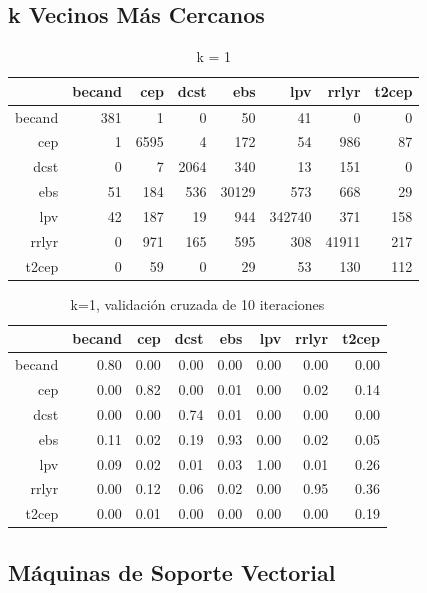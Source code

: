 \documentclass[letterpaper,12pt]{book}
\begin{document}
\subsection{k Vecinos Más Cercanos}
\begin{table}[ht]
  \centering
  \caption{k = 1} 
  \label{table:cmknn}
  \begin{tabular}{rrrrrrrr}
    \hline
    & becand & cep & dcst & ebs & lpv & rrlyr & t2cep \\ 
    \hline
    becand & 381 &   1 &   0 &  50 &  41 &   0 &   0 \\ 
    cep &   1 & 6595 &   4 & 172 &  54 & 986 &  87 \\ 
    dcst &   0 &   7 & 2064 & 340 &  13 & 151 &   0 \\ 
    ebs &  51 & 184 & 536 & 30129 & 573 & 668 &  29 \\ 
    lpv &  42 & 187 &  19 & 944 & 342740 & 371 & 158 \\ 
    rrlyr &   0 & 971 & 165 & 595 & 308 & 41911 & 217 \\ 
    t2cep &   0 &  59 &   0 &  29 &  53 & 130 & 112 \\ 
    \hline
  \end{tabular}
\end{table}

\begin{table}[ht]
  \centering
  \caption{k=1, validación cruzada de 10 iteraciones} 
  \label{table:cmCvKnn}
  \begin{tabular}{rrrrrrrr}
    \hline
    & becand & cep & dcst & ebs & lpv & rrlyr & t2cep \\ 
    \hline
    becand & 0.80 & 0.00 & 0.00 & 0.00 & 0.00 & 0.00 & 0.00 \\ 
    cep & 0.00 & 0.82 & 0.00 & 0.01 & 0.00 & 0.02 & 0.14 \\ 
    dcst & 0.00 & 0.00 & 0.74 & 0.01 & 0.00 & 0.00 & 0.00 \\ 
    ebs & 0.11 & 0.02 & 0.19 & 0.93 & 0.00 & 0.02 & 0.05 \\ 
    lpv & 0.09 & 0.02 & 0.01 & 0.03 & 1.00 & 0.01 & 0.26 \\ 
    rrlyr & 0.00 & 0.12 & 0.06 & 0.02 & 0.00 & 0.95 & 0.36 \\ 
    t2cep & 0.00 & 0.01 & 0.00 & 0.00 & 0.00 & 0.00 & 0.19 \\ 
    \hline
  \end{tabular}
\end{table}
\subsection{Máquinas de Soporte Vectorial}
\end{document}
